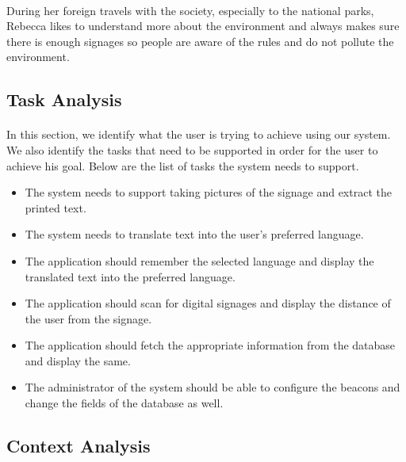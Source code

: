\documentclass[12pt]{article}
\begin{document}
\paragraph{} During her foreign travels with the society, especially to the national parks, Rebecca likes to understand more about the environment and always makes sure there is enough signages so people are aware of the rules and do not pollute the environment. 

\subsection{Task Analysis}
\label{task}
\paragraph{}In this section, we identify what the user is trying to achieve using our system. We also identify the tasks that need to be supported in order for the user to achieve his goal. Below are the list of tasks the system needs to support. 

\begin{itemize}

 \item The system needs to support taking pictures of the signage and extract the printed text. 
 
  \item The system needs to translate text into the user's preferred language.
 
  \item The application should remember the selected language and display the translated text into the preferred language.
  
  \item The application should scan for digital signages and display the distance of the user from the signage.
  
    \item The application should fetch the appropriate information from the database and display the same.
    
    \item The administrator of the system should be able to configure the beacons and change the fields of the database as well.
    
    \end{itemize}
    
    \subsection{Context Analysis}
    
\end{document}
